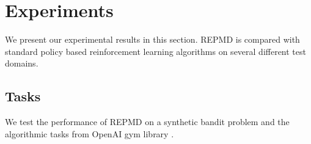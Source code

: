 \documentclass{article}
\begin{document}
%
%

\section{Experiments}
We present our experimental results in this section. REPMD is compared with standard policy based reinforcement learning algorithms on several different test domains.   

\subsection{Tasks}
We test the performance of REPMD on a synthetic bandit problem and the algorithmic tasks from OpenAI gym library \cite{1606.01540}.  
\end{document}
